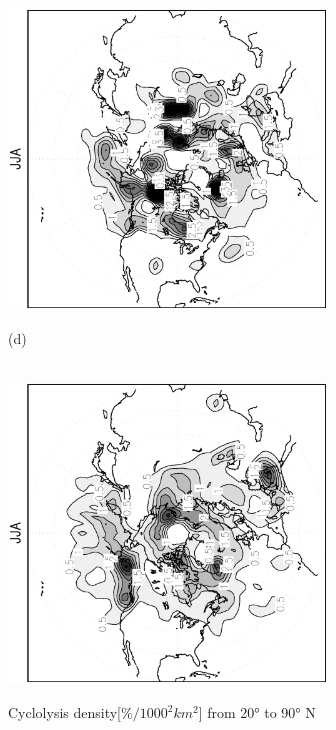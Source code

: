 \documentclass[12pt,a4paper,twoside,openright,headinclude,liststotoc,bibtotoc]{scrreprt}
\begin{document}
\begin{appendix}
\begin{figure}[c]
{\includegraphics[height=8.0cm,angle=-90]
{eps/cycllys_PLASIM_T21_45JJA.eps}
}
\parbox{8.5cm}{\hspace{0.95cm}\begin{scriptsize}(d)\end{scriptsize} \vspace{-0.5cm} \\
\includegraphics[height=8.0cm,angle=-90]
{eps/cycllys_ERA40_T21_45JJA.eps}
}
\caption[Cyclolysis density Northern Hemisphere]{Cyclolysis density[$\%/1000^2 km^2$] from 20° to 90° N}
\label{img:NHcycllys}
\end{figure}



\end{appendix}
\end{document}
